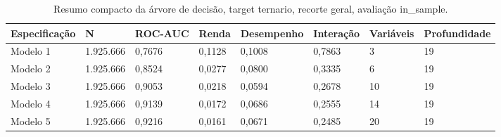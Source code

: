 \begin{table}
\caption{Resumo compacto da árvore de decisão, target ternario, recorte geral, avaliação in_sample.}
\label{tab:tabela_compacta_treeClassification_19_profundidade_ternario_recorte_geral_in_sample}
\begin{tabular}{llllllll}
\toprule
Especificação & N & ROC-AUC & Renda & Desempenho & Interação & Variáveis & Profundidade \\
\midrule
Modelo 1 & 1.925.666 & 0,7676 & 0,1128 & 0,1008 & 0,7863 & 3 & 19 \\
Modelo 2 & 1.925.666 & 0,8524 & 0,0277 & 0,0800 & 0,3335 & 6 & 19 \\
Modelo 3 & 1.925.666 & 0,9053 & 0,0218 & 0,0594 & 0,2678 & 10 & 19 \\
Modelo 4 & 1.925.666 & 0,9139 & 0,0172 & 0,0686 & 0,2555 & 14 & 19 \\
Modelo 5 & 1.925.666 & 0,9216 & 0,0161 & 0,0671 & 0,2485 & 20 & 19 \\
\bottomrule
\end{tabular}
\end{table}
